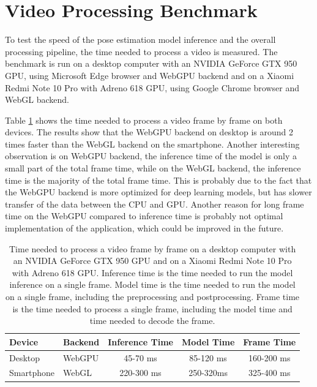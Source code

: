 \section{Video Processing Benchmark}
\label{speed_of_the_video_processing}
To test the speed of the pose estimation model inference and the overall processing pipeline, the time needed to process a video is measured. The benchmark is run on a desktop computer with an NVIDIA GeForce GTX 950 GPU, using Microsoft Edge browser and WebGPU backend and on a Xiaomi Redmi Note 10 Pro with Adreno 618 GPU, using Google Chrome browser and WebGL backend.

Table \ref{tab:video_processing_time} shows the time needed to process a video frame by frame on both devices. The results show that the WebGPU backend on desktop is around 2 times faster than the WebGL backend on the smartphone. Another interesting observation is on WebGPU backend, the inference time of the model is only a small part of the total frame time, while on the WebGL backend, the inference time is the majority of the total frame time. This is probably due to the fact that the WebGPU backend is more optimized for deep learning models, but has slower transfer of the data between the CPU and GPU. Another reason for long frame time on the WebGPU compared to inference time is probably not optimal implementation of the application, which could be improved in the future.

\begin{table}[htbp]
    \centering
    \begin{tabular}{l l  c c c}
        \toprule
        Device     & Backend & Inference Time & Model Time & Frame Time \\
        \midrule
        Desktop    & WebGPU  & 45-70 ms       & 85-120 ms  & 160-200 ms \\
        Smartphone & WebGL   & 220-300 ms     & 250-320ms  & 325-400 ms \\
        \bottomrule
    \end{tabular}
    \caption{Time needed to process a video frame by frame on a desktop computer with an NVIDIA GeForce GTX 950 GPU and on a Xiaomi Redmi Note 10 Pro with Adreno 618 GPU. Inference time is the time needed to run the model inference on a single frame. Model time is the time needed to run the model on a single frame, including the preprocessing and postprocessing. Frame time is the time needed to process a single frame, including the model time and time needed to decode the frame.}
    \label{tab:video_processing_time}
\end{table}


